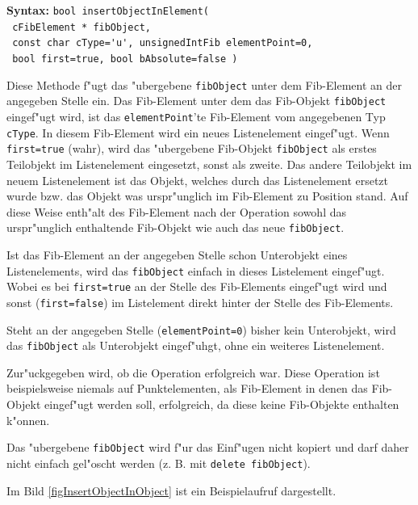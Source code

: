 \textbf{Syntax:} \verb|bool insertObjectInElement(| \\\verb| cFibElement * fibObject,| \\\verb| const char cType='u', unsignedIntFib elementPoint=0,| \\\verb| bool first=true, bool bAbsolute=false )|

\bigskip\noindent
Diese Methode f"ugt das "ubergebene \verb|fibObject| unter dem Fib-Element an der angegeben Stelle ein. Das Fib-Element unter dem das Fib-Objekt \verb|fibObject| eingef"ugt wird, ist das \verb|elementPoint|'te Fib-Element vom angegebenen Typ \verb|cType|. In diesem Fib-Element wird ein neues Listenelement eingef"ugt. Wenn \verb|first=true| (wahr), wird das "ubergebene Fib-Objekt \verb|fibObject| als erstes Teilobjekt im Listenelement eingesetzt, sonst als zweite. Das andere Teilobjekt im neuem Listenelement ist das Objekt, welches durch das Listenelement ersetzt wurde bzw. das Objekt was urspr"unglich im Fib-Element zu Position stand. Auf diese Weise enth"alt des Fib-Element nach der Operation sowohl das urspr"unglich enthaltende Fib-Objekt wie auch das neue \verb|fibObject|.

Ist das Fib-Element an der angegeben Stelle schon Unterobjekt eines Listenelements, wird das \verb|fibObject| einfach in dieses Listelement eingef"ugt. Wobei es bei \verb|first=true| an der Stelle des Fib-Elements eingef"ugt wird und sonst (\verb|first=false|) im Listelement direkt hinter der Stelle des Fib-Elements.

Steht an der angegeben Stelle (\verb|elementPoint=0|) bisher kein Unterobjekt, wird das \verb|fibObject| als Unterobjekt eingef"uhgt, ohne ein weiteres Listenelement.

Zur"uckgegeben wird, ob die Operation erfolgreich war. Diese Operation ist beispielsweise niemals auf Punktelementen, als Fib-Element in denen das Fib-Objekt eingef"ugt werden soll, erfolgreich, da diese keine Fib-Objekte enthalten k"onnen.

Das "ubergebene \verb|fibObject| wird f"ur das Einf"ugen nicht kopiert und darf daher nicht einfach gel"oscht werden (z. B. mit \verb|delete fibObject|).

Im Bild \ref{figInsertObjectInObject} ist ein Beispielaufruf dargestellt.


\graphicspath{{./material_sprachimplementation/}}
\graphicspath{{./material_sprachimplementation/}{../material_sprachimplementation}}

